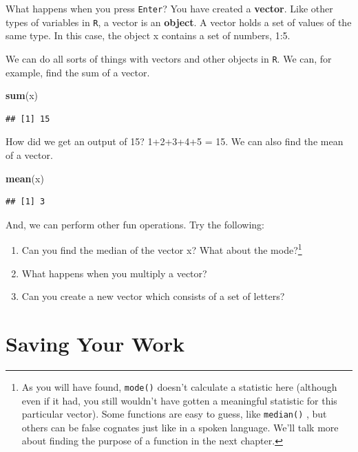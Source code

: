 \documentclass[
]{book}
\newenvironment{Shaded}{\begin{snugshade}}{\end{snugshade}}
\newcommand{\FunctionTok}[1]{\textcolor[rgb]{0.13,0.29,0.53}{\textbf{#1}}}
\newcommand{\NormalTok}[1]{#1}
\begin{document}
What happens when you press \texttt{Enter}? You have created a \textbf{vector}. Like other types of variables in \texttt{R}, a vector is an \textbf{object}. A vector holds a set of values of the same type. In this case, the object x contains a set of numbers, 1:5.

We can do all sorts of things with vectors and other objects in \texttt{R}. We can, for example, find the sum of a vector.

\begin{Shaded}
\begin{Highlighting}[]
\FunctionTok{sum}\NormalTok{(x)}
\end{Highlighting}
\end{Shaded}

\begin{verbatim}
## [1] 15
\end{verbatim}

How did we get an output of 15? 1+2+3+4+5 = 15. We can also find the mean of a vector.

\begin{Shaded}
\begin{Highlighting}[]
\FunctionTok{mean}\NormalTok{(x)}
\end{Highlighting}
\end{Shaded}

\begin{verbatim}
## [1] 3
\end{verbatim}

And, we can perform other fun operations. Try the following:

\begin{enumerate}
\def\labelenumi{\arabic{enumi}.}
\item
  Can you find the median of the vector x? What about the mode?\footnote{As you will have found, \texttt{mode()} doesn't calculate a statistic here (although even if it had, you still wouldn't have gotten a meaningful statistic for this particular vector). Some functions are easy to guess, like \texttt{median()} , but others can be false cognates just like in a spoken language. We'll talk more about finding the purpose of a function in the next chapter.}
\item
  What happens when you multiply a vector?
\item
  Can you create a new vector which consists of a set of letters?
\end{enumerate}

\hypertarget{saving-your-work}{%
\section{Saving Your Work}\label{saving-your-work}}
\end{document}
